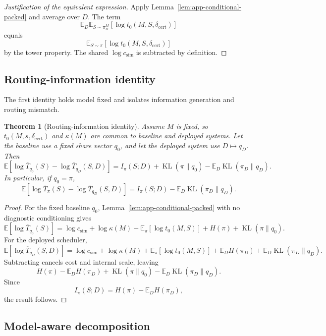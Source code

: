 \documentclass{article}
\newtheorem{theorem}{Theorem}
\DeclareMathOperator{\KL}{KL}
\newcommand{\E}{\mathbb{E}}
\begin{document}
\begin{proof}[Justification of the equivalent expression]
Apply Lemma~\ref{lem:app-conditional-packed} and average over \(D\).
The term
\[
    \E_D\E_{S\sim\pi_D^M}[\log t_0(M,S,\delta_{\mathrm{cert}})]
\]
equals
\[
    \E_{S\sim\pi}[\log t_0(M,S,\delta_{\mathrm{cert}})]
\]
by the tower property.
The shared \(\log c_{\mathrm{sim}}\) is subtracted by definition.
\end{proof}

\subsection{Routing-information identity}

The first identity holds model fixed and isolates information generation and routing mismatch.

\begin{theorem}[Routing-information identity]
\label{thm:app-routing-information}
Assume \(M\) is fixed, so \(t_0(M,s,\delta_{\mathrm{cert}})\) and \(\kappa(M)\) are common
to baseline and deployed systems.
Let the baseline use a fixed share vector \(q_0\), and let the deployed system use
\(D\mapsto q_D\).
Then
\[
\boxed{
    \E
    \left[
        \log \overline T_{q_0}(S)
        -
        \log \overline T_{q_D}(S,D)
    \right]
    =
    I_\pi(S;D)+\KL(\pi\|q_0)-\E_D\KL(\pi_D\|q_D).
}
\]
In particular, if \(q_0=\pi\),
\[
    \E
    \left[
        \log \overline T_{\pi}(S)
        -
        \log \overline T_{q_D}(S,D)
    \right]
    =
    I_\pi(S;D)-\E_D\KL(\pi_D\|q_D).
\]
\end{theorem}

\begin{proof}
For the fixed baseline \(q_0\), Lemma~\ref{lem:app-conditional-packed} with no diagnostic
conditioning gives
\[
    \E[\log \overline T_{q_0}(S)]
    =
    \log c_{\mathrm{sim}}
    +
    \log\kappa(M)
    +
    \E_\pi[\log t_0(M,S)]
    +
    H(\pi)
    +
    \KL(\pi\|q_0).
\]
For the deployed scheduler,
\[
    \E[\log \overline T_{q_D}(S,D)]
    =
    \log c_{\mathrm{sim}}
    +
    \log\kappa(M)
    +
    \E_\pi[\log t_0(M,S)]
    +
    \E_D H(\pi_D)
    +
    \E_D\KL(\pi_D\|q_D).
\]
Subtracting cancels cost and internal scale, leaving
\[
    H(\pi)-\E_DH(\pi_D)+\KL(\pi\|q_0)-\E_D\KL(\pi_D\|q_D).
\]
Since
\[
    I_\pi(S;D)=H(\pi)-\E_DH(\pi_D),
\]
the result follows.
\end{proof}

\subsection{Model-aware decomposition}
\end{document}
